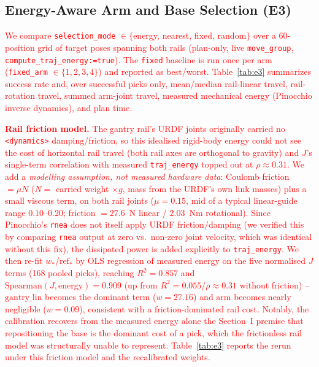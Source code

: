 \documentclass[conference]{IEEEtran}
\begin{document}
\subsection{Energy-Aware Arm and Base Selection (E3)}

\textcolor{red}{We compare \texttt{selection\_mode} $\in\{$energy, nearest, fixed,
random$\}$ over a 60-position grid of target poses spanning both rails
(plan-only, live \texttt{move\_group}, \texttt{compute\_traj\_energy:=true}). The
\texttt{fixed} baseline is run once per arm (\texttt{fixed\_arm} $\in\{1,2,3,4\}$)
and reported as best/worst. Table~\ref{tab:e3} summarizes success rate and, over
successful picks only, mean/median rail-linear travel, rail-rotation travel,
summed arm-joint travel, measured mechanical energy (Pinocchio inverse dynamics),
and plan time.}

\textcolor{red}{\textbf{Rail friction model.} The gantry rail's URDF joints
originally carried no \texttt{<dynamics>} damping/friction, so this idealised
rigid-body energy could not see the cost of horizontal rail travel (both rail
axes are orthogonal to gravity) and $J$'s single-term correlation with measured
\texttt{traj\_energy} topped out at $\rho\approx0.31$. We add a
\emph{modelling assumption, not measured hardware data}: Coulomb friction
$=\mu N$ ($N=$ carried weight $\times g$, mass from the URDF's own link masses)
plus a small viscous term, on both rail joints ($\mu=0.15$, mid of a typical
linear-guide range 0.10--0.20; friction $=27.6$~N linear / $2.03$~Nm rotational).
Since Pinocchio's \texttt{rnea} does not itself apply URDF friction/damping (we
verified this by comparing \texttt{rnea} output at zero vs.\ non-zero joint
velocity, which was identical without this fix), the dissipated power is added
explicitly to \texttt{traj\_energy}. We then re-fit $w_*$/$\mathrm{ref}_*$ by OLS
regression of measured energy on the five normalised $J$ terms (168 pooled picks),
reaching $R^2=0.857$ and $\mathrm{Spearman}(J,\mathrm{energy})=0.909$ (up from
$R^2=0.055$/$\rho\approx0.31$ without friction) -- $\mathrm{gantry\_lin}$ becomes
the dominant term ($w=27.16$) and $\mathrm{arm}$ becomes nearly negligible
($w=0.09$), consistent with a friction-dominated rail cost. Notably, the
calibration recovers from the measured energy alone the Section~I premise that
repositioning the base is the dominant cost of a pick, which the frictionless rail
model was structurally unable to represent. Table~\ref{tab:e3}
reports the rerun under this friction model and the recalibrated weights.}
\end{document}
